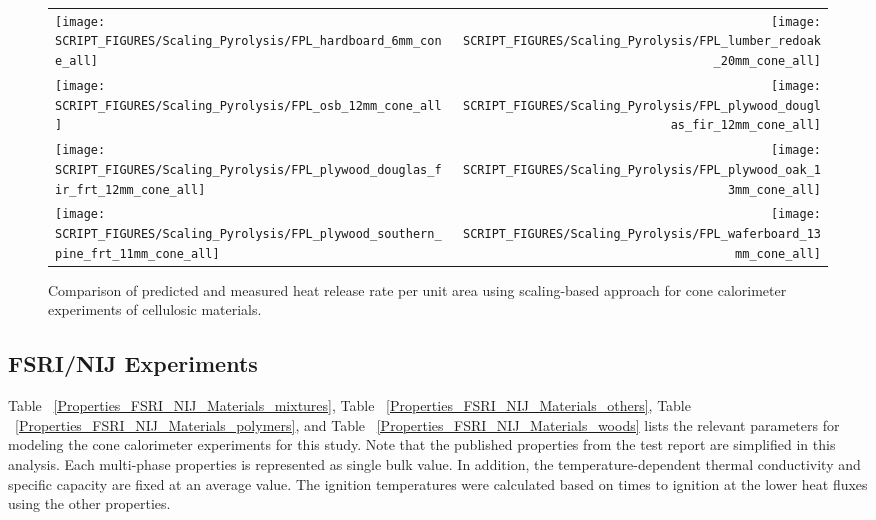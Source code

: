 \begin{figure}[p]
\begin{tabular*}{\textwidth}{l@{\extracolsep{\fill}}r}
\texttt{[image: SCRIPT\_FIGURES/Scaling\_Pyrolysis/FPL\_hardboard\_6mm\_cone\_all]} &
\texttt{[image: SCRIPT\_FIGURES/Scaling\_Pyrolysis/FPL\_lumber\_redoak\_20mm\_cone\_all]} \\
\texttt{[image: SCRIPT\_FIGURES/Scaling\_Pyrolysis/FPL\_osb\_12mm\_cone\_all]} &
\texttt{[image: SCRIPT\_FIGURES/Scaling\_Pyrolysis/FPL\_plywood\_douglas\_fir\_12mm\_cone\_all]} \\
\texttt{[image: SCRIPT\_FIGURES/Scaling\_Pyrolysis/FPL\_plywood\_douglas\_fir\_frt\_12mm\_cone\_all]} &
\texttt{[image: SCRIPT\_FIGURES/Scaling\_Pyrolysis/FPL\_plywood\_oak\_13mm\_cone\_all]} \\
\texttt{[image: SCRIPT\_FIGURES/Scaling\_Pyrolysis/FPL\_plywood\_southern\_pine\_frt\_11mm\_cone\_all]} &
\texttt{[image: SCRIPT\_FIGURES/Scaling\_Pyrolysis/FPL\_waferboard\_13mm\_cone\_all]} \\
\end{tabular*}
\caption[HRRPUA of FPL materials using scaling model]
{Comparison of predicted and measured heat release rate per unit area using scaling-based approach for cone calorimeter experiments of cellulosic materials.}
\label{FPL_Wood_HRR_woods}
\end{figure}


\clearpage





\subsection{FSRI/NIJ Experiments}\label{sec_FSRI_NIJ_Materials}

Table ~\ref{Properties_FSRI_NIJ_Materials_mixtures}, Table ~\ref{Properties_FSRI_NIJ_Materials_others}, Table ~\ref{Properties_FSRI_NIJ_Materials_polymers}, and Table ~\ref{Properties_FSRI_NIJ_Materials_woods} lists the relevant parameters for modeling the cone calorimeter experiments for this study.
Note that the published properties from the test report are simplified in this analysis. Each multi-phase properties is represented as single bulk value.
In addition, the temperature-dependent thermal conductivity and specific capacity are fixed at an average value.
The ignition temperatures were calculated based on times to ignition at the lower heat fluxes using the other properties.



